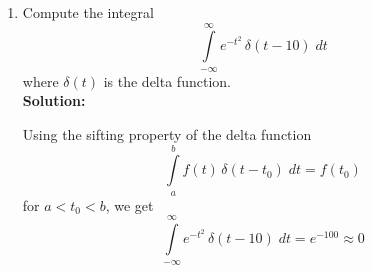 \begin{enumerate}
  \item Compute the integral
    \[
    \int\limits_{-\infty}^{\infty} e^{-t^2} \, \delta(t-10)\; dt
    \]
    where $\delta(t)$ is the delta function.\\
    \textbf{Solution:}

  Using the sifting property of the delta function
  \[
  \int\limits_{a}^{b} f(t) \, \delta(t-t_0)\; dt = f(t_0)
  \]
  for $a < t_0 < b$, we get
  \[
  \int\limits_{-\infty}^{\infty} e^{-t^2} \, \delta(t-10)\; dt = e^{-100} \approx 0
  \]  
\end{enumerate}
